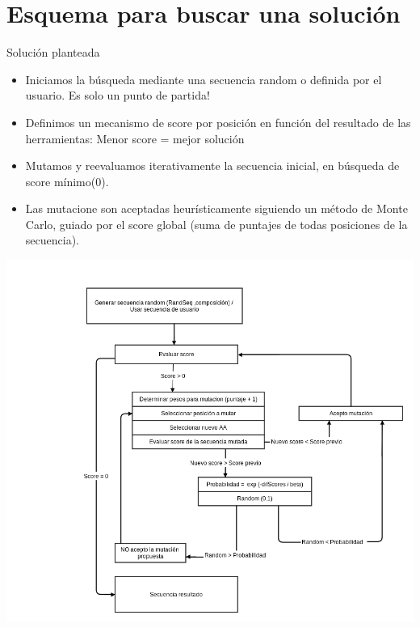 \documentclass{beamer}
\begin{document}

\section{Esquema para buscar una solución}

\begin{frame}{Solución planteada}
\begin{itemize}
 \item Iniciamos la búsqueda mediante una secuencia random o definida por el usuario. Es solo un punto de partida!
 \item Definimos un mecanismo de score por posición en función del resultado de las herramientas:
    Menor score = mejor solución  
 \item Mutamos y reevaluamos iterativamente la secuencia inicial, en búsqueda de score mínimo(0). 
 \item Las mutacione son aceptadas heurísticamente siguiendo un método de Monte Carlo, guiado por el score global (suma de puntajes de todas posiciones de la secuencia).
\end{itemize}
\end{frame}

\begin{frame}
 \includegraphics[width=\textwidth,height=\textheight]{esquemaGeneral.png}
\end{frame}
\end{document}
